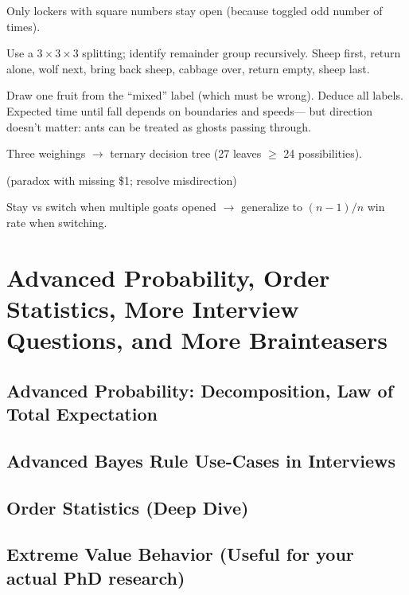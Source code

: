 \documentclass{report}
\begin{document}

\sol

Only lockers with square numbers stay open
(because toggled odd number of times).


\sol

Use a $3\times3\times3$ splitting; identify remainder group recursively.
\sol
Sheep first, return alone, wolf next, bring back sheep, cabbage over, return empty, sheep last.

\sol
Draw one fruit from the “mixed” label (which must be wrong).
Deduce all labels.
\sol
Expected time until fall depends on boundaries and speeds—
but direction doesn't matter: ants can be treated as ghosts passing through.

\sol 
Three weighings $\to$  ternary decision tree (27 leaves $\ge$ 24 possibilities).

\sol
(paradox with missing \$1; resolve misdirection)

\sol
Stay vs switch when multiple goats opened $\to$ generalize to $(n-1)/n$ win rate when switching.\newline


\section{Advanced Probability, Order Statistics, More Interview Questions, and More Brainteasers}

\subsection*{Advanced Probability: Decomposition, Law of Total Expectation}
\subsection*{Advanced Bayes Rule Use-Cases in Interviews}
\subsection*{Order Statistics (Deep Dive)}
\subsection*{Extreme Value Behavior (Useful for your actual PhD research)}
\end{document}

